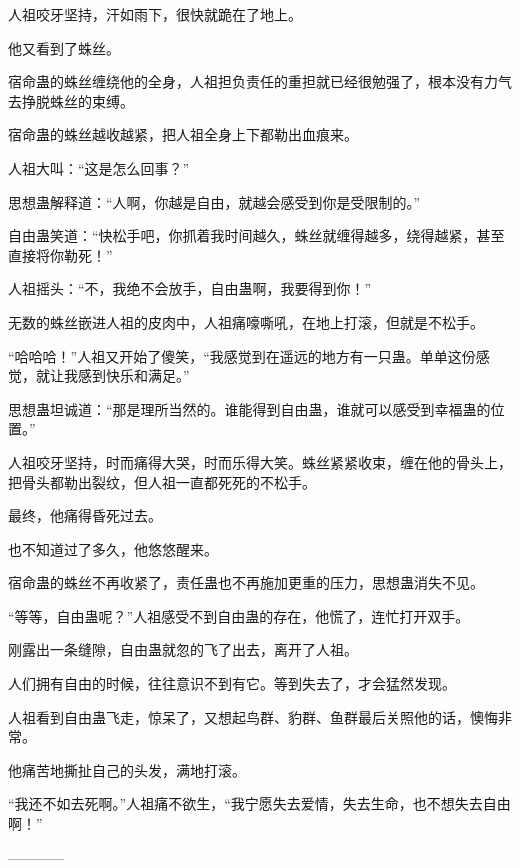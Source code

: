 \begin{this_body}
人祖咬牙坚持，汗如雨下，很快就跪在了地上。

他又看到了蛛丝。

宿命蛊的蛛丝缠绕他的全身，人祖担负责任的重担就已经很勉强了，根本没有力气去挣脱蛛丝的束缚。

宿命蛊的蛛丝越收越紧，把人祖全身上下都勒出血痕来。

人祖大叫：“这是怎么回事？”

思想蛊解释道：“人啊，你越是自由，就越会感受到你是受限制的。”

自由蛊笑道：“快松手吧，你抓着我时间越久，蛛丝就缠得越多，绕得越紧，甚至直接将你勒死！”

人祖摇头：“不，我绝不会放手，自由蛊啊，我要得到你！”

无数的蛛丝嵌进人祖的皮肉中，人祖痛嚎嘶吼，在地上打滚，但就是不松手。

“哈哈哈！”人祖又开始了傻笑，“我感觉到在遥远的地方有一只蛊。单单这份感觉，就让我感到快乐和满足。”

思想蛊坦诚道：“那是理所当然的。谁能得到自由蛊，谁就可以感受到幸福蛊的位置。”

人祖咬牙坚持，时而痛得大哭，时而乐得大笑。蛛丝紧紧收束，缠在他的骨头上，把骨头都勒出裂纹，但人祖一直都死死的不松手。

最终，他痛得昏死过去。

也不知道过了多久，他悠悠醒来。

宿命蛊的蛛丝不再收紧了，责任蛊也不再施加更重的压力，思想蛊消失不见。

“等等，自由蛊呢？”人祖感受不到自由蛊的存在，他慌了，连忙打开双手。

刚露出一条缝隙，自由蛊就忽的飞了出去，离开了人祖。

人们拥有自由的时候，往往意识不到有它。等到失去了，才会猛然发现。

人祖看到自由蛊飞走，惊呆了，又想起鸟群、豹群、鱼群最后关照他的话，懊悔非常。

他痛苦地撕扯自己的头发，满地打滚。

“我还不如去死啊。”人祖痛不欲生，“我宁愿失去爱情，失去生命，也不想失去自由啊！”

------------

\end{this_body}

